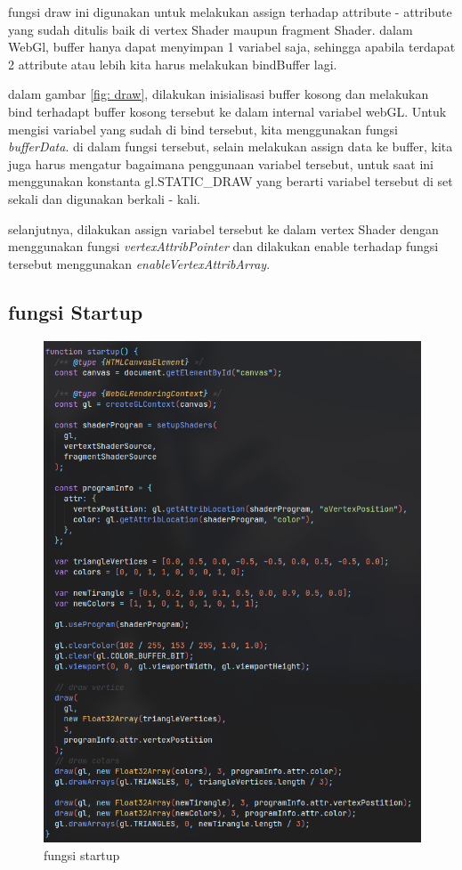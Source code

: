 fungsi draw ini digunakan untuk melakukan assign terhadap attribute - attribute yang sudah ditulis baik di
vertex Shader maupun fragment Shader. dalam WebGl, buffer hanya dapat menyimpan 1 variabel saja, sehingga apabila
terdapat 2 attribute atau lebih kita harus melakukan bindBuffer lagi.

dalam gambar \ref{fig: draw}, dilakukan inisialisasi buffer kosong dan melakukan bind terhadapt buffer kosong tersebut
ke dalam internal variabel webGL. Untuk mengisi variabel yang sudah di bind tersebut, kita menggunakan fungsi \emph{bufferData}.
di dalam fungsi tersebut, selain melakukan assign data ke buffer, kita juga harus mengatur bagaimana penggunaan variabel tersebut,
untuk saat ini menggunakan konstanta gl.STATIC\_DRAW yang berarti variabel tersebut di set sekali dan digunakan berkali - kali.

selanjutnya, dilakukan assign variabel tersebut ke dalam vertex Shader dengan menggunakan fungsi \emph{vertexAttribPointer} dan dilakukan
enable terhadap fungsi tersebut menggunakan \emph{enableVertexAttribArray}.

\subsection{fungsi Startup}

\begin{figure}[!h]
    \centering
    \includegraphics[width=\textwidth]{grafika/startup.png}
    \caption{fungsi startup}
    \label{fig: startup}
\end{figure}

